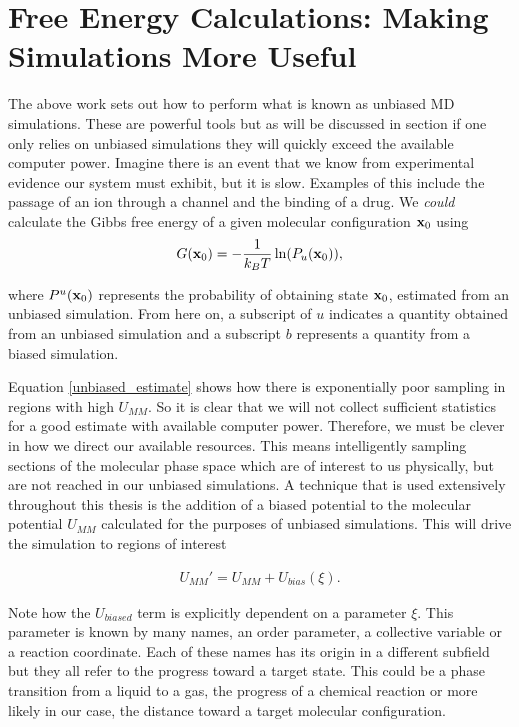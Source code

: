 \section{Free Energy Calculations: Making Simulations More Useful}
The above work sets out how to perform what is known as unbiased MD simulations. These are powerful tools but as will be discussed in section  if one only relies on unbiased simulations they will quickly exceed the available computer power. Imagine there is an event that we know from experimental evidence our system must exhibit, but it is slow. Examples of this include the passage of an ion through a channel and the binding of a drug. We \textit{could} calculate the Gibbs free energy of a given molecular configuration $\bold{x}_0$ using 
\begin{equation}
	G (\bold{x}_0) = -\frac{1}{k_BT}\ln(P_{u}(\bold{x}_0)),
	\label{unbiased_estimate}
\end{equation}

where $P^u(\bold{x}_0)$ represents the probability of obtaining state $\bold{x}_0$, estimated from an unbiased simulation. From here on, a subscript of $u$ indicates a quantity obtained from an unbiased simulation and a subscript $b$ represents a quantity from a biased simulation. 

Equation \ref{unbiased_estimate} shows how there is exponentially poor sampling in regions with high $U_{MM}$. So it is clear that we will not collect sufficient statistics for a good estimate with available computer power. Therefore, we must be clever in how we direct our available resources. This means intelligently sampling sections of the molecular phase space which are of interest to us physically, but are not reached in our unbiased simulations. A technique that is used extensively throughout this thesis is the addition of a biased potential to the molecular potential $U_{MM}$ calculated for the purposes of unbiased simulations. This will drive the simulation to regions of interest

\begin{equation}
\begin{aligned}
U_{MM}'  = U_{MM} + U_{bias} (\xi).
\end{aligned}
\end{equation}

Note how the $U_{biased}$ term is explicitly dependent on a parameter $\xi$. This parameter is known by many names, an order parameter, a collective variable or a reaction coordinate. Each of these names has its origin in a different subfield but they all refer to the progress toward a target state. This could be a phase transition from a liquid to a gas, the progress of a chemical reaction or more likely in our case, the distance toward a target molecular configuration. 

